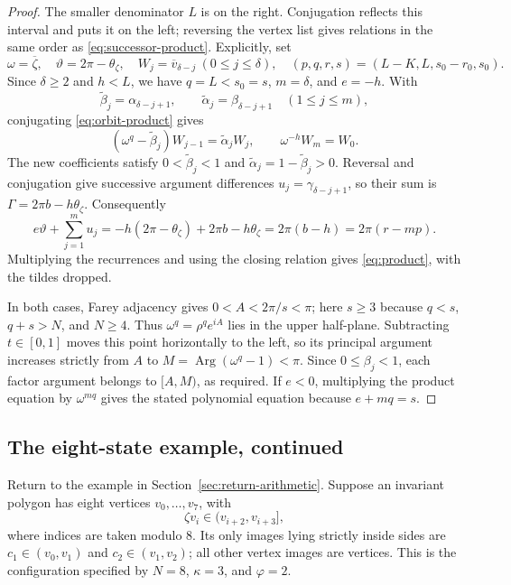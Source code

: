 \documentclass[11pt,a4paper]{article}
\DeclareMathOperator{\Arg}{Arg}
\theoremstyle{definition}
\theoremstyle{remark}
\numberwithin{equation}{section}
\begin{document}
\begin{proof}
The smaller denominator $L$ is on the right. Conjugation reflects this interval and puts it on the left; reversing the vertex list gives relations in the same order as \eqref{eq:successor-product}. Explicitly, set
\[
 \omega=\overline\zeta,\quad\vartheta=2\pi-\theta_\zeta,\quad
 W_j=\overline v_{\delta-j}\ (0\le j\le\delta),\quad
 (p,q,r,s)=(L-K,L,s_0-r_0,s_0).
\]
Since $\delta\ge2$ and $h<L$, we have $q=L<s_0=s$, $m=\delta$, and $e=-h$. With
\[
 \widetilde\beta_j=\alpha_{\delta-j+1},\qquad
 \widetilde\alpha_j=\beta_{\delta-j+1}\quad(1\le j\le m),
\]
conjugating \eqref{eq:orbit-product} gives
\[
 (\omega^q-\widetilde\beta_j)W_{j-1}=\widetilde\alpha_jW_j,
 \qquad \omega^{-h}W_m=W_0.
\]
The new coefficients satisfy $0<\widetilde\beta_j<1$ and $\widetilde\alpha_j=1-\widetilde\beta_j>0$. Reversal and conjugation give successive argument differences $u_j=\gamma_{\delta-j+1}$, so their sum is $\Gamma=2\pi b-h\theta_\zeta$. Consequently
\[
 e\vartheta+\sum_{j=1}^m u_j
 =-h(2\pi-\theta_\zeta)+2\pi b-h\theta_\zeta
 =2\pi(b-h)=2\pi(r-mp).
\]
Multiplying the recurrences and using the closing relation gives \eqref{eq:product}, with the tildes dropped.

In both cases, Farey adjacency gives $0<A<2\pi/s<\pi$; here $s\ge3$ because $q<s$, $q+s>N$, and $N\ge4$. Thus $\omega^q=\rho^q e^{iA}$ lies in the upper half-plane. Subtracting $t\in[0,1]$ moves this point horizontally to the left, so its principal argument increases strictly from $A$ to $M=\Arg(\omega^q-1)<\pi$. Since $0\le\beta_j<1$, each factor argument belongs to $[A,M)$, as required. If $e<0$, multiplying the product equation by $\omega^{mq}$ gives the stated polynomial equation because $e+mq=s$.
\end{proof}

\subsection*{The eight-state example, continued}
Return to the example in Section~\ref{sec:return-arithmetic}. Suppose an invariant polygon has eight vertices $v_0,\ldots,v_7$, with
\[
 \zeta v_i\in(v_{i+2},v_{i+3}],
\]
where indices are taken modulo $8$. Its only images lying strictly inside sides are $c_1\in(v_0,v_1)$ and $c_2\in(v_1,v_2)$; all other vertex images are vertices. This is the configuration specified by $N=8$, $\kappa=3$, and $\varphi=2$.
\end{document}
